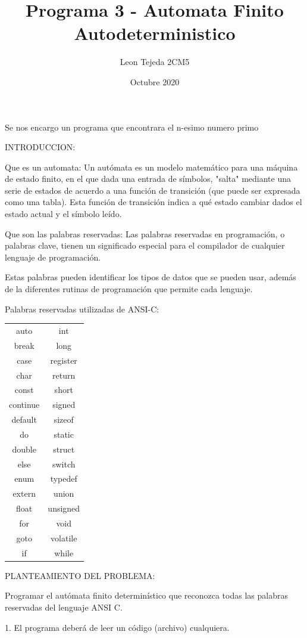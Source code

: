 \documentclass{article}
\title{Programa 3 - Automata Finito Autodeterministico}
\author{Leon Tejeda 2CM5}
\date{Octubre 2020}
\begin{document}
\maketitle
\begin{flushleft}
Se nos encargo un programa que encontrara el n-esimo numero primo

INTRODUCCION:

Que es un automata:	Un autómata es un modelo matemático para una máquina de estado finito, en el que dada una entrada de símbolos, "salta" mediante una serie de estados de acuerdo a una función de transición (que puede ser expresada como una tabla). Esta función 					de transición indica a qué estado cambiar dados el estado actual y el símbolo leído.

Que son las palabras reservadas:	Las palabras reservadas en programación, o palabras clave, tienen un significado especial para el compilador de cualquier lenguaje de programación.

						Estas palabras pueden identificar los tipos de datos que se pueden usar, además de la diferentes rutinas de programación que permite cada lenguaje.

Palabras reservadas utilizadas de ANSI-C:
\begin{tabular}{c c}
auto		&	int \\
break		&	long \\
case		&	register \\
char		&	return \\
const		&	short \\
continue	&	signed \\
default	&	sizeof \\
do		&	static \\
double	&	struct \\
else		&	switch \\
enum		&	typedef \\
extern	&	union \\
float		&	unsigned \\
for		&	void \\
goto		&	volatile \\
if		&	while \\
\end{tabular} 

PLANTEAMIENTO DEL PROBLEMA:

Programar el autómata finito determinístico que reconozca todas las palabras reservadas del lenguaje ANSI C.

1. El programa deberá de leer un código (archivo) cualquiera.


\end{flushleft}
\end{document}
